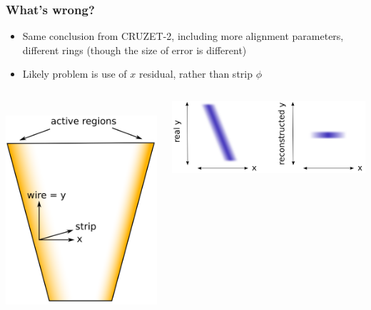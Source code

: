 \documentclass[compress]{beamer}
\begin{document}
\begin{frame}
\addtocounter{page}{-35}
\frametitle{What's wrong?}
\small
\begin{itemize}
\item Same conclusion from CRUZET-2, including more alignment parameters, different rings (though the size of error is different)
\item Likely problem is use of $x$ residual, rather than strip $\phi$
\end{itemize}

\begin{columns}
\mbox{ } \hfill \includegraphics[width=0.7\linewidth]{directions.png} \hfill \mbox{ }

\vspace{0.5 cm}
\includegraphics[width=\linewidth]{ignorance_of_y.png}


\end{columns}
\end{frame}
\end{document}

